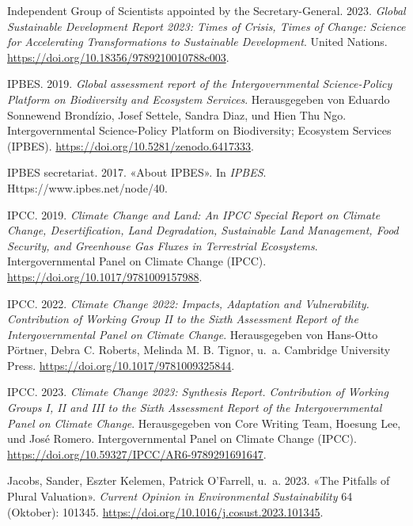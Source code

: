 \documentclass[
  nswissgerman,
  a4paper,
  openany]{book}
\newlength{\cslhangindent}
\newenvironment{CSLReferences}[2] %
 {\begin{list}{}{%
  \setlength{\itemindent}{0pt}
  \setlength{\leftmargin}{0pt}
  \setlength{\parsep}{0pt}
  \ifodd #1
   \setlength{\leftmargin}{\cslhangindent}
   \setlength{\itemindent}{-1\cslhangindent}
  \fi
  \setlength{\itemsep}{#2\baselineskip}}}
 {\end{list}}
\begin{document}
\begin{CSLReferences}{1}{1}
Independent Group of Scientists appointed by the Secretary-General.
2023. \emph{Global {Sustainable Development Report} 2023: {Times} of
Crisis, Times of Change: {Science} for Accelerating Transformations to
Sustainable Development}. United Nations.
\url{https://doi.org/10.18356/9789210010788c003}.

IPBES. 2019. \emph{Global assessment report of the {Intergovernmental}
{Science}-{Policy} {Platform} on {Biodiversity} and {Ecosystem}
{Services}}. Herausgegeben von Eduardo Sonnewend Brondízio, Josef
Settele, Sandra Diaz, und Hien Thu Ngo. Intergovernmental Science-Policy
Platform on Biodiversity; Ecosystem Services (IPBES).
\url{https://doi.org/10.5281/zenodo.6417333}.

IPBES secretariat. 2017. {«About {IPBES}»}. In \emph{IPBES}.
Https://www.ipbes.net/node/40.

IPCC. 2019. \emph{Climate {Change} and {Land}: An {IPCC} Special Report
on Climate Change, Desertification, Land Degradation, Sustainable Land
Management, Food Security, and Greenhouse Gas Fluxes in Terrestrial
Ecosystems}. Intergovernmental Panel on Climate Change (IPCC).
\url{https://doi.org/10.1017/9781009157988}.

IPCC. 2022. \emph{Climate {Change} 2022: {Impacts}, Adaptation and
Vulnerability. {Contribution} of {Working Group II} to the {Sixth
Assessment Report} of the {Intergovernmental Panel} on {Climate
Change}}. Herausgegeben von Hans-Otto Pörtner, Debra C. Roberts, Melinda
M. B. Tignor, u.~a. Cambridge University Press.
\url{https://doi.org/10.1017/9781009325844}.

IPCC. 2023. \emph{Climate {Change} 2023: {Synthesis Report}.
{Contribution} of {Working Groups I}, {II} and {III} to the {Sixth
Assessment Report} of the {Intergovernmental Panel} on {Climate
Change}}. Herausgegeben von Core Writing Team, Hoesung Lee, und José
Romero. Intergovernmental Panel on Climate Change (IPCC).
\url{https://doi.org/10.59327/IPCC/AR6-9789291691647}.

Jacobs, Sander, Eszter Kelemen, Patrick O'Farrell, u.~a. 2023. {«The
Pitfalls of Plural Valuation»}. \emph{Current Opinion in Environmental
Sustainability} 64 (Oktober): 101345.
\url{https://doi.org/10.1016/j.cosust.2023.101345}.


\end{CSLReferences}
\end{document}
